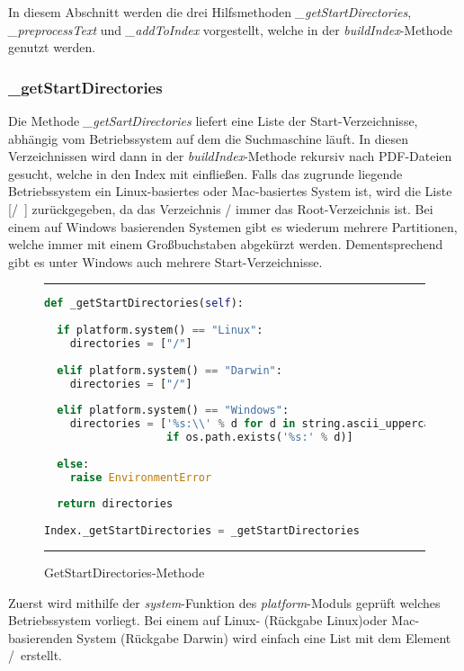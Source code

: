 In diesem Abschnitt werden die drei Hilfsmethoden \textit{\_getStartDirectories}, \textit{\_preprocessText} und \textit{\_addToIndex} vorgestellt, welche in der \textit{buildIndex}-Methode genutzt werden.

\subsubsection{\_getStartDirectories}

Die Methode \textit{\_getSartDirectories} liefert eine Liste der Start-Verzeichnisse, abhängig vom Betriebssystem auf dem die Suchmaschine läuft. In diesen Verzeichnissen wird dann in der \textit{buildIndex}-Methode rekursiv nach PDF-Dateien gesucht, welche in den Index mit einfließen. Falls das zugrunde liegende Betriebssystem ein Linux-basiertes oder Mac-basiertes System ist, wird die Liste [\glqq /\grqq\ ] zurückgegeben, da das Verzeichnis / immer das Root-Verzeichnis ist. Bei einem auf Windows basierenden Systemen gibt es wiederum mehrere Partitionen, welche immer mit einem Großbuchstaben abgekürzt werden. Dementsprechend gibt es unter Windows auch mehrere Start-Verzeichnisse.

\begin{figure}
	\rule{\textwidth}{0.4pt}
	\begin{lstlisting}[language=Python]
def _getStartDirectories(self):
	
  if platform.system() == "Linux":
    directories = ["/"]
	
  elif platform.system() == "Darwin":
    directories = ["/"]
	
  elif platform.system() == "Windows":
    directories = ['%s:\\' % d for d in string.ascii_uppercase
                   if os.path.exists('%s:' % d)]
	
  else:
    raise EnvironmentError
	
  return directories
	
Index._getStartDirectories = _getStartDirectories
	\end{lstlisting}
	\rule{\textwidth}{0.4pt}
	\caption{GetStartDirectories-Methode}
	\label{fig:start}
\end{figure}

Zuerst wird mithilfe der \textit{system}-Funktion des \textit{platform}-Moduls geprüft welches Betriebssystem vorliegt. Bei einem auf Linux- (Rückgabe \glqq Linux\grqq)oder Mac-basierenden System (Rückgabe \glqq Darwin\grqq) wird einfach eine List mit dem Element \glqq /\grqq\ erstellt.

